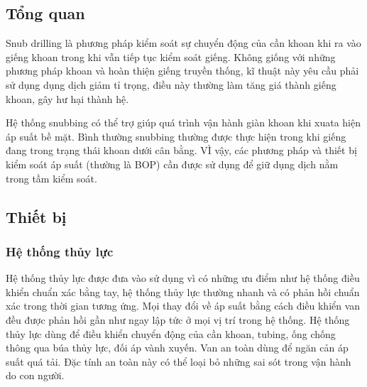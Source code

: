 \documentclass[13pt,a4paper]{article}
\begin{document}
\subsection{Tổng quan}
	Snub drilling là phương pháp kiểm soát sự chuyển động của cần khoan khi ra vào giếng khoan trong khi vẫn tiếp tục kiểm soát giếng. Không giống với những phương pháp khoan và hoàn thiện giếng truyền thống, kĩ thuật này yêu cầu phải sử dụng dụng dịch giảm tỉ trọng, điều này thường làm tăng giá thành giếng khoan, gây hư hại thành hệ.\par
	Hệ thống snubbing có thể trợ giúp quá trình vận hành giàn khoan khi xuata hiện áp suất bề mặt. Bình thường snubbing thường được thực hiện trong khi giếng đang trong trạng thái khoan dưới cân bằng. VÌ vậy, các phương pháp và thiết bị kiểm soát áp suất (thường là BOP) cần được sử dụng để giữ dụng dịch nằm trong tầm kiểm soát.
\subsection{Thiết bị}
	\subsubsection{Hệ thống thủy lực}
	Hệ thống thủy lực được đưa vào sử dụng vì có những ưu điểm như hệ thống điều khiển chuẩn xác bằng tay, hệ thống thủy lực thường nhanh và có phản hồi chuẩn xác trong thời gian tương ứng. Mọi thay đổi về áp suất bằng cách điều khiển van đều được phản hồi gần như ngay lập tức ở mọi vị trí trong hệ thống. Hệ thống thủy lực dùng để điều khiển chuyển động của cần khoan, tubing, ống chống thông qua búa thủy lực, đối áp vành xuyến. Van an toàn dùng để ngăn cản áp suất quá tải. Đặc tính an toàn này có thể loại bỏ những sai sót trong vận hành do con người.
\end{document}
